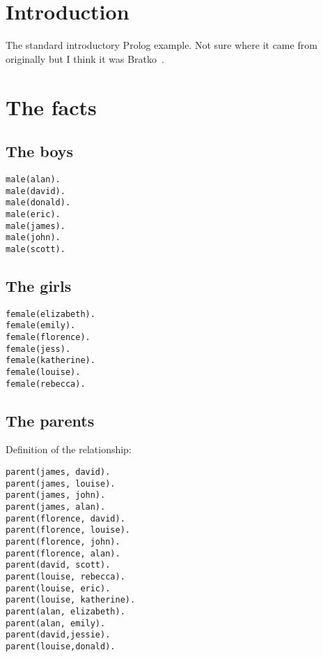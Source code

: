 \documentclass[twocolumn,global]{svjour}
\begin{document}

\section{ Introduction}
The standard introductory Prolog example. Not sure where it came 
from originally but I think it was Bratko~\cite{bratko01}.
\section{ The facts }
\subsection{ The boys }\begin{Verbatim}
male(alan).
male(david).
male(donald).
male(eric).
male(james).
male(john).
male(scott).
\end{Verbatim}
\subsection{ The girls }\begin{Verbatim}
female(elizabeth).
female(emily).
female(florence).
female(jess).
female(katherine).
female(louise).
female(rebecca).
\end{Verbatim}
\subsection{ The parents  }
Definition of the  relationship: 
\begin{Verbatim}
parent(james, david).
parent(james, louise).
parent(james, john).
parent(james, alan).
parent(florence, david).
parent(florence, louise).
parent(florence, john).
parent(florence, alan).
parent(david, scott).
parent(louise, rebecca).
parent(louise, eric).
parent(louise, katherine).
parent(alan, elizabeth).
parent(alan, emily).
parent(david,jessie).
parent(louise,donald).
\end{Verbatim}
\end{document}
